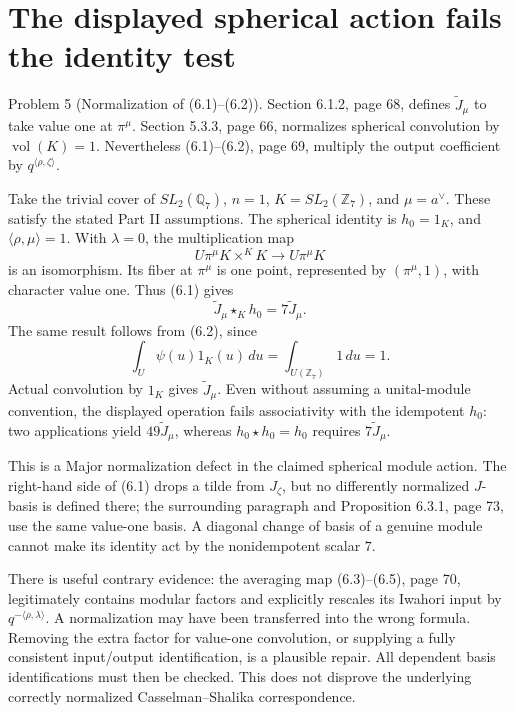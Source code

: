 \documentclass[10pt]{article}
\begin{document}
\section*{The displayed spherical action fails the identity test}
Problem 5 (Normalization of (6.1)–(6.2)).  Section 6.1.2, page 68, defines \(\widetilde J_\mu\) to take value one at \(\pi^\mu\). Section 5.3.3, page 66, normalizes spherical convolution by \(\operatorname{vol}(K)=1\). Nevertheless (6.1)–(6.2), page 69, multiply the output coefficient by \(q^{\langle\rho,\zeta\rangle}\).\par
Take the trivial cover of \(SL_2(\mathbb Q_7)\), \(n=1\), \(K=SL_2(\mathbb Z_7)\), and \(\mu=a^\vee\). These satisfy the stated Part II assumptions. The spherical identity is \(h_0=1_K\), and \(\langle\rho,\mu\rangle=1\). With \(\lambda=0\), the multiplication map \[U\pi^\mu K\times^K K\longrightarrow U\pi^\mu K\] is an isomorphism. Its fiber at \(\pi^\mu\) is one point, represented by \((\pi^\mu,1)\), with character value one. Thus (6.1) gives \[\widetilde J_\mu\star_K h_0=7\widetilde J_\mu.\] The same result follows from (6.2), since \[\int_U\psi(u)1_K(u)\,du
 =\int_{U(\mathbb Z_7)}1\,du=1.\] Actual convolution by \(1_K\) gives \(\widetilde J_\mu\). Even without assuming a unital-module convention, the displayed operation fails associativity with the idempotent \(h_0\): two applications yield \(49\widetilde J_\mu\), whereas \(h_0\star h_0=h_0\) requires \(7\widetilde J_\mu\).\par
This is a Major normalization defect in the claimed spherical module action. The right-hand side of (6.1) drops a tilde from \(J_\zeta\), but no differently normalized \(J\)-basis is defined there; the surrounding paragraph and Proposition 6.3.1, page 73, use the same value-one basis. A diagonal change of basis of a genuine module cannot make its identity act by the nonidempotent scalar \(7\).\par
There is useful contrary evidence: the averaging map (6.3)–(6.5), page 70, legitimately contains modular factors and explicitly rescales its Iwahori input by \(q^{-\langle\rho,\lambda\rangle}\). A normalization may have been transferred into the wrong formula. Removing the extra factor for value-one convolution, or supplying a fully consistent input/output identification, is a plausible repair. All dependent basis identifications must then be checked. This does not disprove the underlying correctly normalized Casselman–Shalika correspondence.\par
\end{document}
